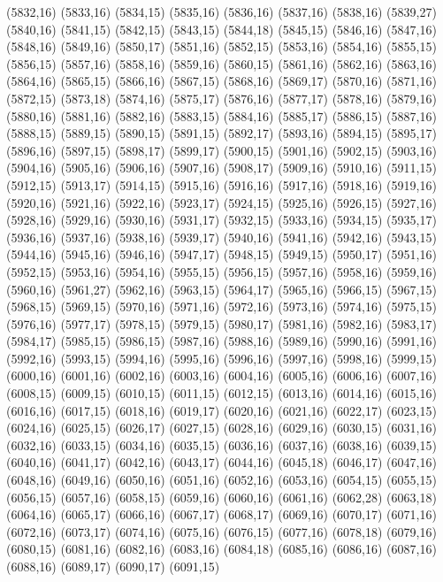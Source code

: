 (5832,16)
(5833,16)
(5834,15)
(5835,16)
(5836,16)
(5837,16)
(5838,16)
(5839,27)
(5840,16)
(5841,15)
(5842,15)
(5843,15)
(5844,18)
(5845,15)
(5846,16)
(5847,16)
(5848,16)
(5849,16)
(5850,17)
(5851,16)
(5852,15)
(5853,16)
(5854,16)
(5855,15)
(5856,15)
(5857,16)
(5858,16)
(5859,16)
(5860,15)
(5861,16)
(5862,16)
(5863,16)
(5864,16)
(5865,15)
(5866,16)
(5867,15)
(5868,16)
(5869,17)
(5870,16)
(5871,16)
(5872,15)
(5873,18)
(5874,16)
(5875,17)
(5876,16)
(5877,17)
(5878,16)
(5879,16)
(5880,16)
(5881,16)
(5882,16)
(5883,15)
(5884,16)
(5885,17)
(5886,15)
(5887,16)
(5888,15)
(5889,15)
(5890,15)
(5891,15)
(5892,17)
(5893,16)
(5894,15)
(5895,17)
(5896,16)
(5897,15)
(5898,17)
(5899,17)
(5900,15)
(5901,16)
(5902,15)
(5903,16)
(5904,16)
(5905,16)
(5906,16)
(5907,16)
(5908,17)
(5909,16)
(5910,16)
(5911,15)
(5912,15)
(5913,17)
(5914,15)
(5915,16)
(5916,16)
(5917,16)
(5918,16)
(5919,16)
(5920,16)
(5921,16)
(5922,16)
(5923,17)
(5924,15)
(5925,16)
(5926,15)
(5927,16)
(5928,16)
(5929,16)
(5930,16)
(5931,17)
(5932,15)
(5933,16)
(5934,15)
(5935,17)
(5936,16)
(5937,16)
(5938,16)
(5939,17)
(5940,16)
(5941,16)
(5942,16)
(5943,15)
(5944,16)
(5945,16)
(5946,16)
(5947,17)
(5948,15)
(5949,15)
(5950,17)
(5951,16)
(5952,15)
(5953,16)
(5954,16)
(5955,15)
(5956,15)
(5957,16)
(5958,16)
(5959,16)
(5960,16)
(5961,27)
(5962,16)
(5963,15)
(5964,17)
(5965,16)
(5966,15)
(5967,15)
(5968,15)
(5969,15)
(5970,16)
(5971,16)
(5972,16)
(5973,16)
(5974,16)
(5975,15)
(5976,16)
(5977,17)
(5978,15)
(5979,15)
(5980,17)
(5981,16)
(5982,16)
(5983,17)
(5984,17)
(5985,15)
(5986,15)
(5987,16)
(5988,16)
(5989,16)
(5990,16)
(5991,16)
(5992,16)
(5993,15)
(5994,16)
(5995,16)
(5996,16)
(5997,16)
(5998,16)
(5999,15)
(6000,16)
(6001,16)
(6002,16)
(6003,16)
(6004,16)
(6005,16)
(6006,16)
(6007,16)
(6008,15)
(6009,15)
(6010,15)
(6011,15)
(6012,15)
(6013,16)
(6014,16)
(6015,16)
(6016,16)
(6017,15)
(6018,16)
(6019,17)
(6020,16)
(6021,16)
(6022,17)
(6023,15)
(6024,16)
(6025,15)
(6026,17)
(6027,15)
(6028,16)
(6029,16)
(6030,15)
(6031,16)
(6032,16)
(6033,15)
(6034,16)
(6035,15)
(6036,16)
(6037,16)
(6038,16)
(6039,15)
(6040,16)
(6041,17)
(6042,16)
(6043,17)
(6044,16)
(6045,18)
(6046,17)
(6047,16)
(6048,16)
(6049,16)
(6050,16)
(6051,16)
(6052,16)
(6053,16)
(6054,15)
(6055,15)
(6056,15)
(6057,16)
(6058,15)
(6059,16)
(6060,16)
(6061,16)
(6062,28)
(6063,18)
(6064,16)
(6065,17)
(6066,16)
(6067,17)
(6068,17)
(6069,16)
(6070,17)
(6071,16)
(6072,16)
(6073,17)
(6074,16)
(6075,16)
(6076,15)
(6077,16)
(6078,18)
(6079,16)
(6080,15)
(6081,16)
(6082,16)
(6083,16)
(6084,18)
(6085,16)
(6086,16)
(6087,16)
(6088,16)
(6089,17)
(6090,17)
(6091,15)
